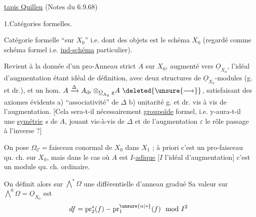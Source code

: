 \begin{flushright}
\uline{tapis Quillen} (Notes du 6.9.68)
\end{flushright}

1.\quad Catégories formelles.

Catégorie formelle  ``sur $X_0$'' i.e. dont  des objets est le schéma $X_0$ (regardé comme  schéma formel i.e. \uline{ind-schéma} particulier).

Revient à la donnée d'un pro-Anneau strict  $A$ sur $X_0$, augmenté vers $\underline O_{X_0}${\reversemarginpar{}}, l'idéal d'augmentation étant idéal de définition, avec deux structures de $\underline O_{X_0}$-modules (g. et dr.), et un hom.  $A\xrightarrow{\Delta}A_{\mathrm{dr}}\otimes_{\underline O_{X_0}}{}_{\mathrm g}A\ \deleted{\unsure{\longrightarrow}}$, satisfaisant des axiomes évidents a) ``associativité'' de $\Delta$ b) unitarité g. et dr. vis à vis de l'augmentation. [Cela sera-t-il nécessairement   \uline{groupoïde} formel, i.e. y-aura-t-il une \uline{symétrie} $s$ de $A$, jouant vis-à-vis de $\Delta$ et de l'augmentation $\varepsilon$ le rôle  passage à l'inverse ?]

On pose $\Omega_{\mathcal C}={}$faisceau conormal de $X_0$ dans $X_1$ ; à priori c'est un pro-faisceau qu. ch. sur $X_0$, mais dans le cas où $A$ est $I$-\uline{adique} [$I$ l'idéal d'augmentation] c'est un module qu. ch. ordinaire.

On définit alors sur $\bigwedge^{*}\Omega$ une différentielle d'anneau gradué  Sa valeur sur $\bigwedge^0\Omega=\underline O_{X_0}$ est
\[
df=\mathrm{pr}_2^{*}(f)-\mathrm{pr}_1^{\unsure{\alpha|*}}(f)\mod I^2
\]


